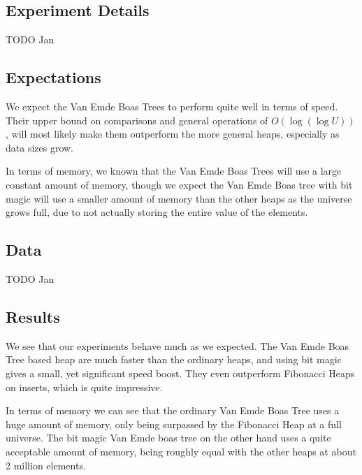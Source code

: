 \subsection{Experiment Details}

TODO Jan

\subsection{Expectations}

We expect the Van Emde Boas Trees to perform quite well in terms of speed. Their upper bound on comparisons and general operations of $O(\log (\log U))$, will most likely  make them outperform the more general heaps, especially as data sizes grow.


In terms of memory, we known that the Van Emde Boas Trees will use a large constant amount of memory, though we expect the Van Emde Boas tree with bit magic will use a smaller amount of memory than the other heaps as the universe grows full, due to not actually storing the entire value of the elements.

\subsection{Data}

TODO Jan

\subsection{Results}

We see that our experiments behave much as we expected. The Van Emde Boas Tree  based heap are much faster than the ordinary heaps, and using bit magic gives a small, yet significant speed boost. They even outperform Fibonacci Heaps on inserts, which is quite impressive.

In terms of memory we can see that the ordinary Van Emde Boas Tree uses a huge amount of memory, only being surpassed by the Fibonacci Heap at a full universe. The bit magic Van Emde boas tree on the other hand uses a quite acceptable amount of memory, being roughly equal with the other heaps at about 2 million elements.